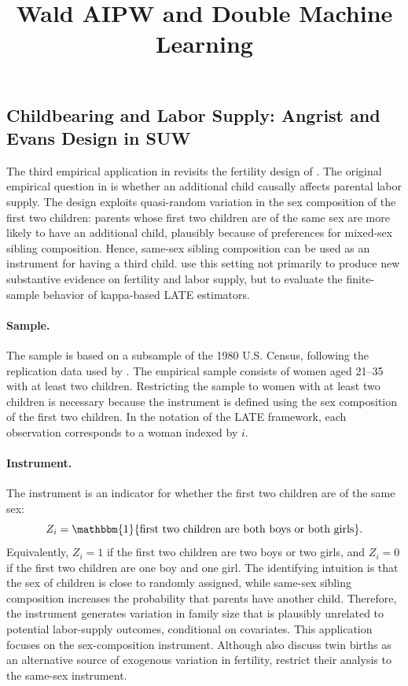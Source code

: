 \documentclass[12pt,a4paper]{article}
\title{Wald AIPW and Double Machine Learning}
\author{}
\date{}
\begin{document}

\subsection{Childbearing and Labor Supply: Angrist and Evans Design in SUW}
\label{subsec:suw_childbearing_design}

The third empirical application in \citet{sloczynski2025abadie} revisits the fertility design of \citet{angrist1996children}. The original empirical question in \citet{angrist1996children} is whether an additional child causally affects parental labor supply. The design exploits quasi-random variation in the sex composition of the first two children: parents whose first two children are of the same sex are more likely to have an additional child, plausibly because of preferences for mixed-sex sibling composition. Hence, same-sex sibling composition can be used as an instrument for having a third child.
\citet{sloczynski2025abadie} use this setting not primarily to produce new substantive evidence on fertility and labor supply, but to evaluate the finite-sample behavior of kappa-based LATE estimators.

\paragraph{Sample.}
The sample is based on a subsample of the 1980 U.S. Census, following the replication data used by \citet{farbmacher2018increasing}. The empirical sample consists of women aged 21--35 with at least two children. Restricting the sample to women with at least two children is necessary because the instrument is defined using the sex composition of the first two children. In the notation of the LATE framework, each observation corresponds to a woman indexed by $i$.

\paragraph{Instrument.}
The instrument is an indicator for whether the first two children are of the same sex:
\begin{equation}
    Z_i = \mathbbm{1}\{\text{first two children are both boys or both girls}\}.
\end{equation}
Equivalently, $Z_i=1$ if the first two children are two boys or two girls, and $Z_i=0$ if the first two children are one boy and one girl. The identifying intuition is that the sex of children is close to randomly assigned, while same-sex sibling composition increases the probability that parents have another child. Therefore, the instrument generates variation in family size that is plausibly unrelated to potential labor-supply outcomes, conditional on covariates.
This application focuses on the sex-composition instrument. Although \citet{angrist1996children} also discuss twin births as an alternative source of exogenous variation in fertility, \citet{sloczynski2025abadie} restrict their analysis to the same-sex instrument.
\end{document}
